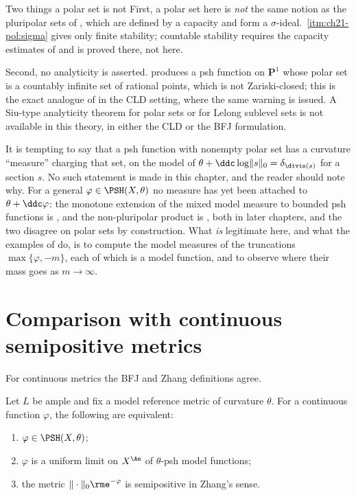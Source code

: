 \begin{warning}{Two things a polar set is not}
First, a polar set here is \emph{not} the same notion as the pluripolar sets
of , which are defined by a capacity and form a
$\sigma$-ideal.  \,\cref{itm:ch21-pol:sigma}
gives only finite stability; countable stability requires the capacity
estimates of  and is proved there, not here.

Second, no analyticity is asserted.  
produces a psh function on $\mathbf P^1$ whose polar set is a countably
infinite set of rational points, which is not Zariski-closed; this is the
exact analogue of  in the CLD setting, where
the same warning is issued.  A Siu-type analyticity theorem for polar sets
or for Lelong sublevel sets is not available in this theory, in either the
CLD or the BFJ formulation.
\end{warning}

\begin{remark}
\label{rem:ch21-polar-ma}
It is tempting to say that a psh function with nonempty polar set has a
curvature ``measure'' charging that set, on the model of
$\theta+\ddc\log\lVert s\rVert_0=\delta_{\divis(s)}$ for a section $s$.
No such statement is made in this chapter, and the reader should note why.
For a general $\varphi\in\PSH(X,\theta)$ no measure has yet been attached
to $\theta+\ddc\varphi$: the monotone extension of the mixed model measure
to bounded psh functions is , and the
non-pluripolar product is , both in later
chapters, and the two disagree on polar sets by construction.  What
\emph{is} legitimate here, and what the examples of
 do, is to compute the model measures of the
truncations $\max\{\varphi,-m\}$, each of which is a model function, and
to observe where their mass goes as $m\to\infty$.
\end{remark}

\section{Comparison with continuous semipositive metrics}
\label{sec:ch21-continuous}

For continuous metrics the BFJ and Zhang definitions agree.

\begin{theorem}\label{thm:ch21-continuous-zhang}
Let $L$ be ample and fix a model reference metric of curvature $\theta$.
For a continuous function $\varphi$, the following are equivalent:

\begin{enumerate}
\item $\varphi\in\PSH(X,\theta)$;
\item $\varphi$ is a uniform limit on $X^{\An}$ of $\theta$-psh model
functions;
\item the metric $\|\cdot\|_0\rme^{-\varphi}$ is semipositive in Zhang's
sense.
\end{enumerate}
\end{theorem}

